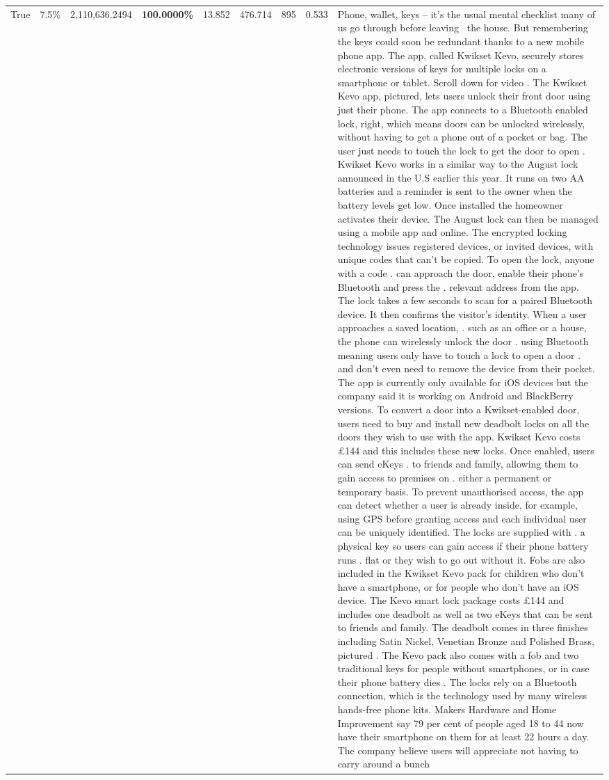 \begin{table}[H]
\begin{tabular}{lllrlllll}
True & 7.5\% & 2,110,636.2494 & \bfseries \color{red} 100.0000\% & 13.852 & 476.714 & 895 & 0.533 & Phone, wallet, keys – it’s the usual mental checklist many of us go through before leaving  the house. But remembering the keys could soon be redundant thanks to a new mobile phone app. The app, called Kwikset Kevo, securely stores electronic versions of keys for multiple locks on a smartphone or tablet. Scroll down for video . The Kwikset Kevo app, pictured, lets users unlock their front door using just their phone. The app connects to a Bluetooth enabled lock, right, which means doors can be unlocked wirelessly, without having to get a phone out of a pocket or bag. The user just needs to touch the lock to get the door to open . Kwikset Kevo works in a similar way to the August lock announced in the U.S earlier this year. It runs on two AA batteries and a reminder is sent to the owner when the battery levels get low. Once installed the homeowner activates their device. The August lock can then be managed using a mobile app and online. The encrypted locking technology issues registered devices, or invited devices, with unique codes that can't be copied. To open the lock, anyone with a code . can approach the door, enable their phone's Bluetooth and press the . relevant address from the app. The lock takes a few seconds to scan for a paired Bluetooth device. It then confirms the visitor's identity. When a user approaches a saved location, . such as an office or a house, the phone can wirelessly unlock the door . using Bluetooth meaning users only have to touch a lock to open a door . and don't even need to remove the device from their pocket. The app is currently only available for iOS devices but the company said it is working on Android and BlackBerry versions. To convert a door into a Kwikset-enabled door, users need to buy and install new deadbolt locks on all the doors they wish to use with the app. Kwikset Kevo costs £144 and this includes these new locks. Once enabled, users can send eKeys . to friends and family, allowing them to gain access to premises on . either a permanent or temporary basis. To prevent unauthorised access, the app can detect whether a user is already inside, for example, using GPS before granting access and each individual user can be uniquely identified. The locks are supplied with . a physical key so users can gain access if their phone battery runs . flat or they wish to go out without it. Fobs are also included in the Kwikset Kevo pack for children who don't have a smartphone, or for people who don't have an iOS device. The Kevo smart lock package costs £144 and includes one deadbolt as well as two eKeys that can be sent to friends and family. The deadbolt comes in three finishes including Satin Nickel, Venetian Bronze and Polished Brass, pictured . The Kevo pack also comes with a fob and two traditional keys for people without smartphones, or in case their phone battery dies . The locks rely on a Bluetooth connection, which is the technology used by many wireless hands-free phone kits. Makers Hardware and Home Improvement say 79 per cent of people aged 18 to 44 now have their smartphone on them for at least 22 hours a day. The company believe users will appreciate not having to carry around a bunch 
\end{tabular}
\end{table}
